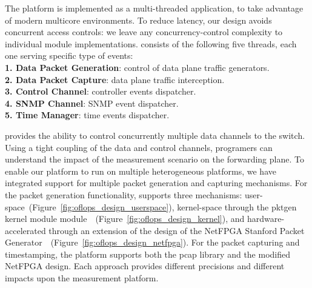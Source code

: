 The platform is implemented as a multi-threaded application, to take
advantage of modern multicore environments. To reduce latency, our design
avoids concurrent access controls: we leave any concurrency-control complexity 
to individual module implementations. \oflops consists of the following five threads, 
each one serving specific type of events:\\
\textbf{1. Data Packet Generation}: control of data plane traffic generators.\\
\textbf{2. Data Packet Capture}: data plane traffic interception.\\
\textbf{3. Control Channel}: controller events dispatcher.\\
\textbf{4. SNMP Channel}: SNMP event dispatcher.\\
\textbf{5. Time Manager}: time events dispatcher.

\oflops provides the ability to control concurrently multiple data channels to
the switch. Using a tight coupling of the data and control channels, programers
can understand the impact of the measurement scenario on the forwarding plane.
To enable our platform to run on multiple heterogeneous platforms, we have
integrated support for multiple packet generation and capturing mechanisms. For
the packet generation functionality, \oflops supports three mechanisms:
user-space~(Figure~\ref{fig:oflops_design_userspace}), kernel-space through the
pktgen kernel module
module~\cite{pktgen}~(Figure~\ref{fig:oflops_design_kernel}), and
hardware-accelerated through an extension of the design of the NetFPGA Stanford
Packet Generator~\cite{Covington09}~(Figure~\ref{fig:oflops_design_netfpga}).
For the packet capturing and timestamping, the platform supports both the pcap
library and the modified NetFPGA design. Each approach provides different
precisions and different impacts upon the measurement platform.

